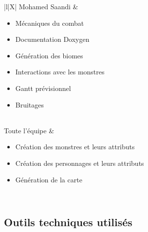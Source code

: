 \documentclass[11pt,a4paper]{article}
\begin{document}
\begin{xltabular}{\textwidth}{|l|X|}
\hline
Mohamed Saandi & 
\begin{itemize}[leftmargin=*, noitemsep]
\item Mécaniques du combat
\item Documentation Doxygen
\item Génération des biomes
\item Interactions avec les monstres
\item Gantt prévisionnel
\item Bruitages
\end{itemize} \\
\hline
Toute l'équipe & 
\begin{itemize}[leftmargin=*, noitemsep]
\item Création des monstres et leurs attributs
\item Création des personnages et leurs attributs
\item Génération de la carte
\end{itemize} \\
\hline
\end{xltabular}

\subsection{Outils techniques utilisés}
\end{document}

